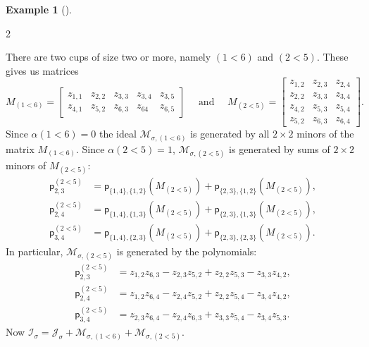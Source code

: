 \documentclass[11pt]{amsart}
\theoremstyle{remark}
\theoremstyle{remark}
\theoremstyle{definition}
\theoremstyle{definition}
\theoremstyle{definition}
\newtheorem{eg_no_qed}[theorem]{Example}
\newenvironment{ex}[1][]{\begin{eg_no_qed}[#1]\renewcommand{\qedsymbol}{$\Diamond$}\pushQED{\qed}}{\popQED\end{eg_no_qed}}
\numberwithin{equation}{section}
\newcommand{\ga}{\alpha}
\newcommand{\gs}{\sigma}
\newcommand{\ci}{\mathcal{I}}
\newcommand{\cj}{\mathcal{J}}
\newcommand{\cm}{\mathcal{M}}
\newcommand{\pl}{\mathsf{p}}
\begin{document}
\begin{ex}
\begin{multicols}{2}
\end{multicols}
\vspace*{-.2in}
There are two cups of size two or more, namely $(1<6)$ and $(2<5)$. These gives us matrices
\begin{equation*}
M_{(1<6)} = \begin{bmatrix}
    z_{1,1}& z_{2,2}& z_{3,3} & z_{3,4} &z_{3,5}\\
    z_{4,1}& z_{5,2}& z_{6,3} & z_{64} &z_{6,5}
    \end{bmatrix}
\quad \text{ and } \quad
M_{(2<5)} = \begin{bmatrix}
    z_{1,2}& z_{2,3}& z_{2,4} \\
    z_{2,2}& z_{3,3}& z_{3,4}\\
    z_{4,2} & z_{5,3} & z_{5,4}\\
    z_{5,2}& z_{6,3}& z_{6,4}
    \end{bmatrix}.
\end{equation*}
Since $\ga(1<6)=0$ the ideal $\cm_{\gs,(1<6)}$ is generated by all $2\times 2$ minors of the matrix $M_{(1<6)}$.  Since $\ga(2<5) = 1$, $\cm_{\gs,(2<5)}$ is generated by sums of $2\times 2$ minors of $M_{(2<5)}$:
\begin{align*}
\pl_{2,3}^{(2<5)} &= \pl_{\{1,4\},\{1,2\}}(M_{(2<5)})+\pl_{\{2,3\},\{1,2\}}(M_{(2<5)}),\\
\pl_{2,4}^{(2<5)}&=\pl_{\{1,4\},\{1,3\}}(M_{(2<5)})+\pl_{\{2,3\},\{1,3\}}(M_{(2<5)}),\\
\pl_{3,4}^{(2<5)}&= \pl_{\{1,4\},\{2,3\}}(M_{(2<5)})+\pl_{\{2,3\},\{2,3\}}(M_{(2<5)}).
\end{align*}
In particular, $\cm_{\gs,(2<5)}$ is generated by the polynomials:
\begin{eqnarray}\label{eq.M25}
\pl_{2,3}^{(2<5)} &=  z_{1,2}z_{6,3}-z_{2,3}z_{5,2}+z_{2,2}z_{5,3}-z_{3,3}z_{4,2}, \\ 
\nonumber \pl_{2,4}^{(2<5)}&= z_{1,2}z_{6,4}-z_{2,4}z_{5,2}+z_{2,2}z_{5,4}-z_{3,4}z_{4,2},\\ 
\pl_{3,4}^{(2<5)} &= z_{2,3}z_{6,4}-z_{2,4}z_{6,3}+z_{3,3}z_{5,4}-z_{3,4}z_{5,3}. \nonumber
\end{eqnarray}
Now $\ci_\gs = \cj_\gs+ \cm_{\gs, (1<6)}+ \cm_{\gs,(2<5)}$. 
\end{ex}
\end{document}
